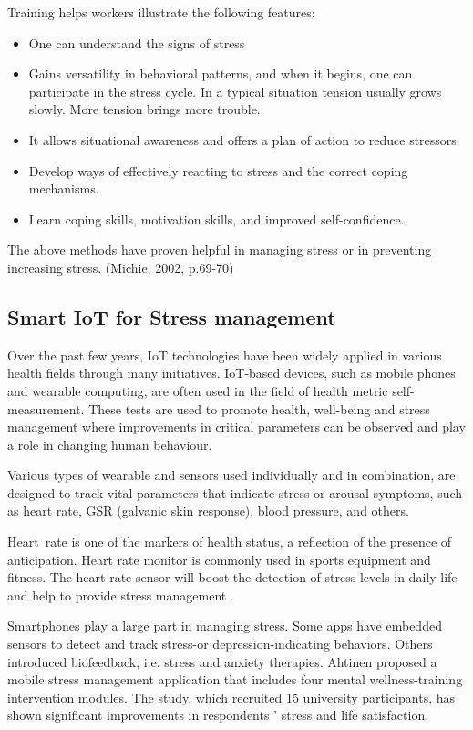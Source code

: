 Training helps workers illustrate the following features:
\begin{itemize}
    \item One can understand the signs of stress 
    \item Gains versatility in behavioral patterns, and when it begins, one can participate in the stress cycle. In a typical situation tension usually grows slowly. More tension brings more trouble. 
    \item It allows situational awareness and offers a plan of action to reduce stressors.
    \item Develop ways of effectively reacting to stress and the correct coping mechanisms. 
    \item Learn coping skills, motivation skills, and improved self-confidence.
\end{itemize}

The above methods have proven helpful in managing stress or in preventing increasing stress. (Michie, 2002, p.69-70)

\subsection{Smart \acs{IoT} for Stress management}
Over the past few years, \acs{IoT} technologies have been widely applied in various health fields through many initiatives. \acs{IoT}-based devices, such as mobile phones and wearable computing, are often used in the field of health metric self-measurement.  These tests are used to promote health, well-being and stress management where improvements in critical parameters can be observed and play a role in changing human behaviour. 

Various types of wearable and sensors used individually and in combination, are designed to track vital parameters that indicate stress or arousal symptoms, such as heart rate, GSR (galvanic skin response), blood pressure, and others. 

Heart rate is one of the markers of health status, a reflection of the presence of anticipation.  Heart rate monitor is commonly used in sports equipment\citep{Fu2015SystemDevice} and fitness.  The heart rate sensor will boost the detection of stress levels in daily life and help to provide stress management\cite[p.330-339]{Millings2015CanTechnology} \cite[p.361-371]{Parnandi2017PhysiologicalGames}.

Smartphones play a large part in managing stress.  Some apps have embedded sensors to detect and track stress-or depression-indicating behaviors\cite[p.175]{Saeb2015MobileStudy}. Others introduced biofeedback, i.e. stress and anxiety therapies\cite[p.1274-1286]{AlOsman2016UbiquitousManagement}\citep{Zafar2017PlayingBiofeedback}. Ahtinen proposed a mobile stress management application that includes four mental wellness-training intervention modules\cite[p.11]{Ahtinen2013MobileStudy}. The study, which recruited 15 university participants, has shown significant improvements in respondents ' stress and life satisfaction.

